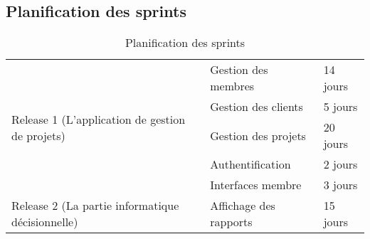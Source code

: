 \FloatBarrier


\subsection{ Planification des sprints}
\FloatBarrier
\begin{table}

\begin{tabular}{|l|l|l|}
\hline
\multirow{5}{*}{Release 1 (L’application de gestion de projets)} & Gestion des membres    & 14 jours  \\
\cline{2-3}
                                                                 & Gestion des clients    & 5 jours   \\
\cline{2-3}
                                                                 & Gestion des projets    & 20 jours  \\
\cline{2-3}
                                                                 & Authentification       & 2 jours   \\
\cline{2-3}
                                                                 & Interfaces membre      & 3 jours   \\
\hline
Release 2 (La partie informatique décisionnelle)                 & Affichage des rapports & 15 jours  \\
\hline
\end{tabular}
\centering
\caption{ Planification des sprints}
\end{table} 
\FloatBarrier